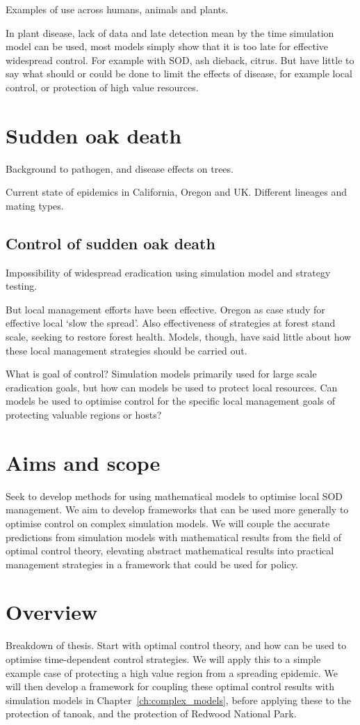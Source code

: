 Examples of use across humans, animals and plants.

In plant disease, lack of data and late detection mean by the time simulation model can be used, most models simply show that it is too late for effective widespread control. For example with SOD, ash dieback, citrus. But have little to say what should or could be done to limit the effects of disease, for example local control, or protection of high value resources.

\section{Sudden oak death}

Background to pathogen, and disease effects on trees.

Current state of epidemics in California, Oregon and UK. Different lineages and mating types.

\subsection{Control of sudden oak death}

Impossibility of widespread eradication using simulation model and strategy testing.

But local management efforts have been effective. Oregon as case study for effective local `slow the spread'. Also effectiveness of strategies at forest stand scale, seeking to restore forest health. Models, though, have said little about how these local management strategies should be carried out.

What is goal of control? Simulation models primarily used for large scale eradication goals, but how can models be used to protect local resources. Can models be used to optimise control for the specific local management goals of protecting valuable regions or hosts?

\section{Aims and scope}

Seek to develop methods for using mathematical models to optimise local SOD management. We aim to develop frameworks that can be used more generally to optimise control on complex simulation models. We will couple the accurate predictions from simulation models with mathematical results from the field of optimal control theory, elevating abstract mathematical results into practical management strategies in a framework that could be used for policy.

\section{Overview}

Breakdown of thesis. Start with optimal control theory, and how can be used to optimise time-dependent control strategies. We will apply this to a simple example case of protecting a high value region from a spreading epidemic. We will then develop a framework for coupling these optimal control results with simulation models in Chapter~\ref{ch:complex_models}, before applying these to the protection of tanoak, and the protection of Redwood National Park.